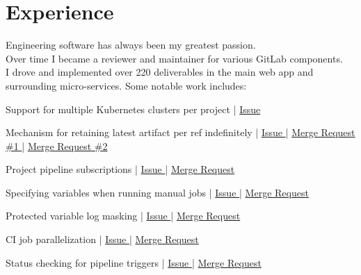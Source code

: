 \documentclass[]{matija-resume}
\begin{document}
\hfill
\begin{minipage}[t]{0.66\textwidth}


\section{Experience}
\vspace{\topsep}
Engineering software has always been my greatest passion.\\
\vspace{\topsep}
Over time I became a reviewer and maintainer for various GitLab components.\\
\vspace{\topsep}
I drove and implemented over 220 deliverables in the main web app and surrounding micro-services. Some notable work includes:
\vspace{\topsep}
\begin{tightemize}
\item Support for multiple Kubernetes clusters per project | \href{https://gitlab.com/gitlab-org/gitlab/-/issues/3734}{Issue }
\item Mechanism for retaining latest artifact per ref indefinitely | \href{https://gitlab.com/gitlab-org/gitlab/-/issues/16267}{Issue } | \href{https://gitlab.com/gitlab-org/gitlab/-/merge_requests/29802}{Merge Request \#1 } | \href{https://gitlab.com/gitlab-org/gitlab/-/merge_requests/30741}{Merge Request \#2 }
\item Project pipeline subscriptions | \href{https://gitlab.com/gitlab-org/gitlab/-/issues/9045}{Issue } | \href{https://gitlab.com/gitlab-org/gitlab/-/merge_requests/20063}{Merge Request }
\item Specifying variables when running manual jobs | \href{https://gitlab.com/gitlab-org/gitlab-foss/-/issues/24935}{Issue } | \href{https://gitlab.com/gitlab-org/gitlab-foss/-/merge_requests/30485}{Merge Request }
\item Protected variable log masking | \href{https://gitlab.com/gitlab-org/gitlab-foss/-/issues/13784}{Issue } | \href{hhttps://gitlab.com/gitlab-org/gitlab-foss/-/merge_requests/25293}{Merge Request }
\item CI job parallelization | \href{https://gitlab.com/gitlab-org/gitlab-foss/-/issues/21480}{Issue } | \href{https://gitlab.com/gitlab-org/gitlab-foss/-/merge_requests/22631}{Merge Request }
\item Status checking for pipeline triggers | \href{https://gitlab.com/gitlab-org/gitlab/-/issues/11238}{Issue } | \href{https://gitlab.com/gitlab-org/gitlab/-/merge_requests/15580}{Merge Request }
\end{tightemize}
\sectionsep


\end{minipage}
\end{document}
